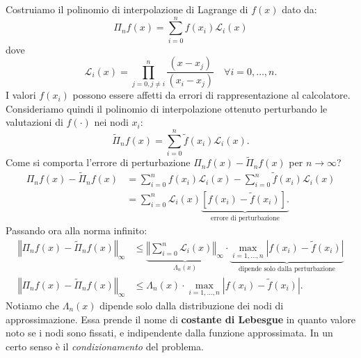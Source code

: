 \begin{figure}[htpb]
\end{figure}
\FloatBarrier

Costruiamo il polinomio di interpolazione di Lagrange di $f(x)$ dato da:
\begin{equation*}
\Pi _{n} f(x) =\sum ^{n}_{i=0} f( x_{i})\mathcal{L}_{i}(x)
\end{equation*}
dove
\begin{equation*}
\mathcal{L}_{i}(x) =\prod ^{n}_{j=0,j\neq i}\frac{( x-x_{j})}{( x_{i} -x_{j})} \quad\forall i=0,\dotsc ,n.
\end{equation*}
I valori $f( x_{i})$ possono essere affetti da errori di rappresentazione al calcolatore. Consideriamo quindi il polinomio di interpolazione ottenuto perturbando le valutazioni di $f( \cdot )$ nei nodi $x_{i}$:
\begin{equation*}
\tilde{\Pi }_{n} f(x) =\sum ^{n}_{i=0}\tilde{f}( x_{i})\mathcal{L}_{i}(x).
\end{equation*}
Come si comporta l'errore di perturbazione $\Pi _{n} f(x) -\tilde{\Pi }_{n} f(x)$ per $n\rightarrow \infty $?
\begin{align*}
\Pi _{n} f(x) -\tilde{\Pi }_{n} f(x) & =\sum ^{n}_{i=0} f( x_{i})\mathcal{L}_{i}(x) -\sum ^{n}_{i=0}\tilde{f}( x_{i})\mathcal{L}_{i}(x)\\
 & =\sum ^{n}_{i=0}\mathcal{L}_{i}(x)\underbrace{\left[ f( x_{i}) -\tilde{f}( x_{i})\right].}_{\text{errore di perturbazione}}
\end{align*}
Passando ora alla norma infinito:
\begin{align*}
\left\Vert \Pi _{n} f(x) -\tilde{\Pi }_{n} f(x)\right\Vert _{\infty } & \leqslant \underbrace{\left\Vert \sum ^{n}_{i=0}\mathcal{L}_{i}(x)\right\Vert _{\infty }}_{\Lambda _{n}(x)} \cdot \underbrace{\max_{i=1,\dotsc ,n}\left| f( x_{i}) -\tilde{f}( x_{i})\right| }_{\text{dipende solo dalla perturbazione}}\\
\left\Vert \Pi _{n} f(x) -\tilde{\Pi }_{n} f(x)\right\Vert _{\infty } & \leqslant \Lambda _{n}(x) \cdot \max_{i=1,\dotsc ,n}\left| f( x_{i}) -\tilde{f}( x_{i})\right| .
\end{align*}
Notiamo che $\Lambda_{n}(x)$ dipende solo dalla distribuzione dei nodi di approssimazione.
Essa prende il nome di \textbf{costante di Lebesgue} in quanto valore noto se i nodi sono fissati, e indipendente dalla funzione approssimata. In un certo senso è il \textit{condizionamento} del problema.

